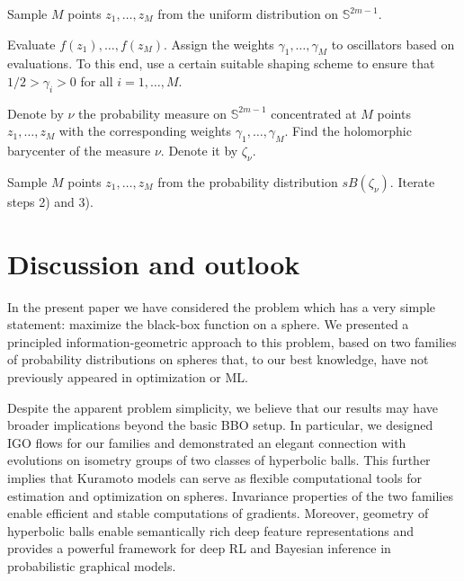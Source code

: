 \documentclass{article}
\theoremstyle{plain}%
\theoremstyle{definition}
\theoremstyle{remark}
\theoremstyle{prop}
\begin{document}
\begin{algorithm}[H]
\caption{Maximum likelihood updates under the model $sB(\zeta)$ by computing stationary points of the IGO flow \eqref{nat_grad_flow_complex}}
\begin{algorithmic}[1]

\State Sample $M$ points $z_1,\dots,z_M$ from the uniform distribution on ${\mathbb S}^{2m-1}$.

\State Evaluate $f(z_1),\dots,f(z_M)$. Assign the weights $\gamma_1,\dots,\gamma_M$ to oscillators based on evaluations. To this end, use a certain suitable shaping scheme to ensure that $1/2>\gamma_i>0$ for all $i=1,\dots,M$. 

\State Denote by $\nu$ the probability measure on $\mathbb S^{2m-1}$ concentrated at $M$ points $z_1,\dots,z_M$ with the corresponding weights $\gamma_1,\dots,\gamma_M$. Find the holomorphic barycenter of the measure $\nu$. Denote it by $\zeta_\nu$.

\State Sample $M$ points $z_1,\dots,z_M$ from the probability distribution $sB(\zeta_\nu)$. Iterate steps 2) and 3).

\end{algorithmic}
\end{algorithm}

\section{Discussion and outlook}

In the present paper we have considered the problem which has a very simple statement: maximize the black-box function on a sphere. We presented a principled information-geometric approach to this problem, based on two families of probability distributions on spheres that, to our best knowledge, have not previously appeared in optimization or ML.

Despite the apparent problem simplicity, we believe that our results may have broader implications beyond the basic BBO setup. In particular, we designed IGO flows for our families and demonstrated an elegant connection with evolutions on isometry groups of two classes of hyperbolic balls. This further implies that Kuramoto models can serve as flexible computational tools for estimation and optimization on spheres. Invariance properties of the two families enable efficient and stable computations of gradients. Moreover, geometry of hyperbolic balls enable semantically rich deep feature representations and provides a powerful framework for deep RL and Bayesian inference in probabilistic graphical models.
\end{document}

